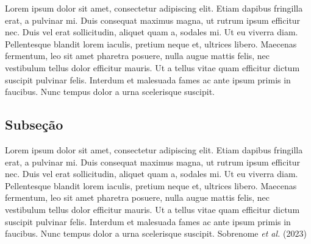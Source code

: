 \documentclass[
  12pt,
  a4paper,
]{td}
\begin{document}
Lorem ipsum dolor sit amet, consectetur adipiscing elit. Etiam dapibus
fringilla erat, a pulvinar mi. Duis consequat maximus magna, ut rutrum
ipsum efficitur nec. Duis vel erat sollicitudin, aliquet quam a, sodales
mi. Ut eu viverra diam. Pellentesque blandit lorem iaculis, pretium
neque et, ultrices libero. Maecenas fermentum, leo sit amet pharetra
posuere, nulla augue mattis felis, nec vestibulum tellus dolor efficitur
mauris. Ut a tellus vitae quam efficitur dictum suscipit pulvinar felis.
Interdum et malesuada fames ac ante ipsum primis in faucibus. Nunc
tempus dolor a urna scelerisque suscipit.

\subsection{Subseção}

Lorem ipsum dolor sit amet, consectetur adipiscing elit. Etiam dapibus
fringilla erat, a pulvinar mi. Duis consequat maximus magna, ut rutrum
ipsum efficitur nec. Duis vel erat sollicitudin, aliquet quam a, sodales
mi. Ut eu viverra diam. Pellentesque blandit lorem iaculis, pretium
neque et, ultrices libero. Maecenas fermentum, leo sit amet pharetra
posuere, nulla augue mattis felis, nec vestibulum tellus dolor efficitur
mauris. Ut a tellus vitae quam efficitur dictum suscipit pulvinar felis.
Interdum et malesuada fames ac ante ipsum primis in faucibus. Nunc
tempus dolor a urna scelerisque suscipit. Sobrenome \emph{et al.} (2023)
\end{document}
